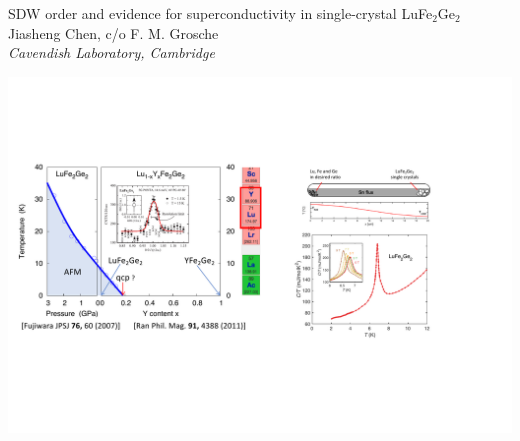 \begin{frame}[label=TitlePage]
\begin{center}
\textcolor[rgb]{0.2,0.2,0.7}{\small SDW order and evidence for superconductivity in single-crystal LuFe$_2$Ge$_2$} \\
\vspace{0.5em}
{\footnotesize Jiasheng Chen, c/o F. M. Grosche} \\
{\footnotesize \em Cavendish Laboratory, Cambridge} \\
\vspace{0.1em}
\end{center}
\vspace{0.0em}
\centerline{ \includegraphics[width=0.9\columnwidth]{IntroPicture}}


\end{frame}
